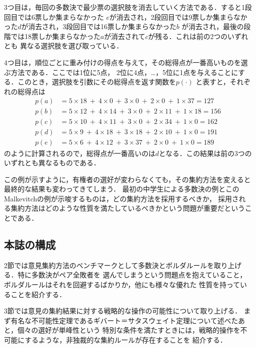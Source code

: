 \documentclass[dvipdfmx]{jsarticle}
\begin{document}
3つ目は，毎回の多数決で最少票の選択肢を消去していく方法である．すると1段回目では6票しか集まらなかった
$e$が消去され，2段回目では9票しか集まらなかった$d$が消去され，3段回目では16票しか集まらなかった$b$
が消去され，最後の段階では18票しか集まらなかった$a$が消去されて$c$が残る．これは前の2つのいずれとも
異なる選択肢を選び取っている．

4つ目は，順位ごとに重み付けの得点を与えて，その総得点が一番高いものを選ぶ方法である．ここでは1位に5点，
2位に4点，\ldots，5位に1点を与えることにする．このとき，選択肢を引数にその総得点を返す関数を$p(\cdot)$
と表すと，それぞれの総得点は
\begin{align*}
  p(a) &= 5 \times 18 \ +\  4 \times 0 \ +\ 3 \times 0 \ +\  2 \times 0\ +\ 1 \times 37 = 127 \\
  p(b) &= 5 \times 12 \ +\  4 \times 14 \ +\ 3 \times 0 \ +\  2 \times 11 \ +\ 1 \times 18 = 156 \\
  p(c) &= 5 \times 10 \ +\  4 \times 11 \ +\ 3 \times 0 \ +\  2 \times 34 \ +\ 1 \times 0 = 162 \\
  p(d) &= 5 \times 9 \ +\  4 \times 18 \ +\ 3 \times 18 \ +\  2 \times 10 \ +\ 1 \times 0 = 191 \\
  p(e) &= 5 \times 6 \ +\  4 \times 12 \ +\ 3 \times 37 \ +\  2 \times 0 \ +\ 1 \times 0 = 189
\end{align*}
のように計算されるので，総得点が一番高いのは$d$となる．この結果は前の3つのいずれとも異なるものである．

この例が示すように，有権者の選好が変わらなくても，その集約方法を変えると最終的な結果も変わってきてしまう．
最初の中学生による多数決の例とこのMalkevitchの例が示唆するものは，どの集約方法を採用するべきか，
採用される集約方法はどのような性質を満たしているべきかという問題が重要だということである．

\subsection{本誌の構成}
2節では意見集約方法のベンチマークとして多数決とボルダルールを取り上げる．特に多数決がペア全敗者を
選んでしまうという問題点を抱えていること，ボルダルールはそれを回避するばかりか，他にも様々な優れた
性質を持っていることを紹介する．

3節では意見の集約結果に対する戦略的な操作の可能性について取り上げる．
まず有名な不可能性定理であるギバート＝サタスウェイト定理について述べたあと，個々の選好が単峰性という
特別な条件を満たすときには，戦略的操作を不可能にするような，非独裁的な集約ルールが存在することを
紹介する．
\end{document}
